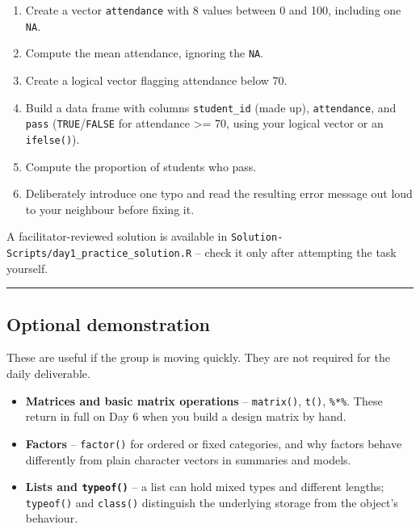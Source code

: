 \documentclass[11pt]{article}
\providecommand{\tightlist}{%
  \setlength{\itemsep}{0pt}\setlength{\parskip}{0pt}}
\begin{document}
\begin{enumerate}
\def\labelenumi{\arabic{enumi}.}
\tightlist
\item
  Create a vector \texttt{attendance} with 8 values between 0 and 100,
  including one \texttt{NA}.
\item
  Compute the mean attendance, ignoring the \texttt{NA}.
\item
  Create a logical vector flagging attendance below 70.
\item
  Build a data frame with columns \texttt{student\_id} (made up),
  \texttt{attendance}, and \texttt{pass} (\texttt{TRUE}/\texttt{FALSE}
  for attendance \textgreater= 70, using your logical vector or an
  \texttt{ifelse()}).
\item
  Compute the proportion of students who pass.
\item
  Deliberately introduce one typo and read the resulting error message
  out loud to your neighbour before fixing it.
\end{enumerate}

A facilitator-reviewed solution is available in
\texttt{Solution-Scripts/day1\_practice\_solution.R} -- check it only
after attempting the task yourself.

\begin{center}\rule{0.5\linewidth}{0.5pt}\end{center}

\hypertarget{optional-demonstration}{%
\subsection{Optional demonstration}\label{optional-demonstration}}

These are useful if the group is moving quickly. They are not required
for the daily deliverable.

\begin{itemize}
\tightlist
\item
  \textbf{Matrices and basic matrix operations} -- \texttt{matrix()},
  \texttt{t()}, \texttt{\%*\%}. These return in full on Day 6 when you
  build a design matrix by hand.
\item
  \textbf{Factors} -- \texttt{factor()} for ordered or fixed categories,
  and why factors behave differently from plain character vectors in
  summaries and models.
\item
  \textbf{Lists and \texttt{typeof()}} -- a list can hold mixed types
  and different lengths; \texttt{typeof()} and \texttt{class()}
  distinguish the underlying storage from the object's behaviour.
\end{itemize}
\end{document}
